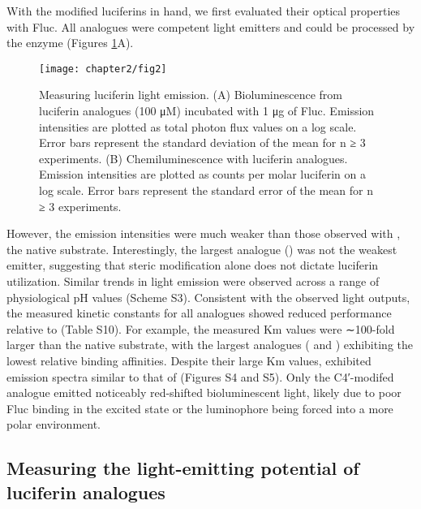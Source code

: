 With the modified luciferins in hand, we first
evaluated their optical properties with Fluc. All analogues were
competent light emitters and could be processed by the enzyme
(Figures \ref{fig:chemilum_biolum}A).
\begin{figure}[htbp]
\texttt{[image: chapter2/fig2]}
\centering
\caption[Measuring luciferin light emission]{Measuring luciferin light emission. (A) Bioluminescence
from luciferin analogues (100 μM) incubated with 1 μg of Fluc.
Emission intensities are plotted as total photon flux values on a log
scale. Error bars represent the standard deviation of the mean for n ≥ 3
experiments. (B) Chemiluminescence with luciferin analogues.
Emission intensities are plotted as counts per molar luciferin on a
log scale. Error bars represent the standard error of the mean for n ≥ 3
experiments.}
  \label{fig:chemilum_biolum}
\end{figure}
However, the emission intensities were much weaker than those observed with \dluciferin{}, the native
substrate. Interestingly, the largest analogue () was not the
weakest emitter, suggesting that steric modification alone does
not dictate luciferin utilization. Similar trends in light emission
were observed across a range of physiological pH values
(Scheme S3). Consistent with the observed light outputs, the
measured kinetic constants for all analogues showed reduced performance relative to \dluciferin{} (Table S10). For example,
the measured Km values were ∼100-fold larger than the native
substrate, with the largest analogues ( and ) exhibiting the
lowest relative binding affinities. Despite their large Km values,
 exhibited emission spectra similar to that of \dluciferin{}
(Figures S4 and S5). Only the C4′-modifed analogue 
emitted noticeably red-shifted bioluminescent light, likely due
to poor Fluc binding in the excited state\cite{Nakatsu:2006jj} or the luminophore
being forced into a more polar environment.\cite{Hirano:2012fu, Viviani:2014cu} %

\subsection*{Measuring the light-emitting potential of luciferin analogues}

